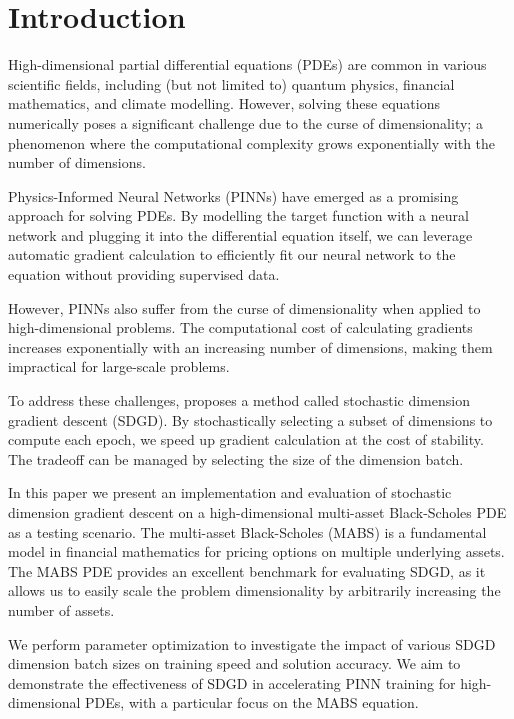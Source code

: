 \documentclass[manuscript,screen,review,acmtog]{acmart}
\begin{document}

\maketitle

\section{Introduction}
High-dimensional partial differential equations (PDEs) are common in various scientific fields, including (but not limited to) quantum physics, financial mathematics, and climate modelling. However, solving these equations numerically poses a significant challenge due to the curse of dimensionality; a phenomenon where the computational complexity grows exponentially with the number of dimensions.

Physics-Informed Neural Networks (PINNs) have emerged as a promising approach for solving PDEs. By modelling the target function with a neural network and plugging it into the differential equation itself, we can leverage automatic gradient calculation to efficiently fit our neural network to the equation without providing supervised data.

However, PINNs also suffer from the curse of dimensionality when applied to high-dimensional problems. The computational cost of calculating gradients increases exponentially with an increasing number of dimensions, making them impractical for large-scale problems.

To address these challenges, \cite{seminal} proposes a method called stochastic dimension gradient descent (SDGD). By stochastically selecting a subset of dimensions to compute each epoch, we speed up gradient calculation at the cost of stability. The tradeoff can be managed by selecting the size of the dimension batch.

In this paper we present an implementation and evaluation of stochastic dimension gradient descent on a high-dimensional multi-asset Black-Scholes PDE as a testing scenario. The multi-asset Black-Scholes (MABS) is a fundamental model in financial mathematics for pricing options on multiple underlying assets. The MABS PDE provides an excellent benchmark for evaluating SDGD, as it allows us to easily scale the problem dimensionality by arbitrarily increasing the number of assets.

We perform parameter optimization to investigate the impact of various SDGD dimension batch sizes on training speed and solution accuracy. We aim to demonstrate the effectiveness of SDGD in accelerating PINN training for high-dimensional PDEs, with a particular focus on the MABS equation.
\end{document}
